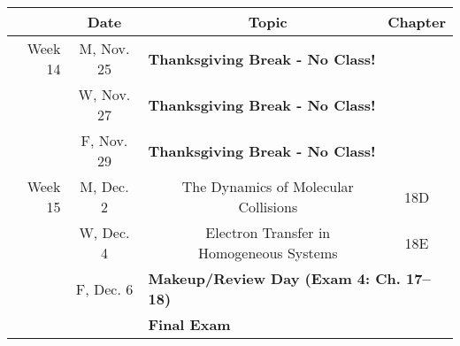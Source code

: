\documentclass[12pt, letterpaper]{article}
\begin{document}
\noindent
\begin{tabular}{rcccc}
& Date && Topic & Chapter\\
\midrule
Week 14 & M, Nov. 25& \multicolumn{3}{l}{\textbf{Thanksgiving Break - No Class!}}\\
& W, Nov. 27& \multicolumn{3}{l}{\textbf{Thanksgiving Break - No Class!}}\\
& F, Nov. 29& \multicolumn{3}{l}{\textbf{Thanksgiving Break - No Class!}}\\
\midrule
Week 15 & M, Dec. 2&& The Dynamics of Molecular Collisions & 18D\\
& W, Dec. 4&& Electron Transfer in Homogeneous Systems & 18E\\
& F, Dec. 6& \multicolumn{3}{l}{\textbf{Makeup/Review Day (Exam 4: Ch. 17--18)}}\\
\midrule
\midrule
& & \multicolumn{3}{l}{\textbf{Final Exam}}\\
\end{tabular}
\end{document}
